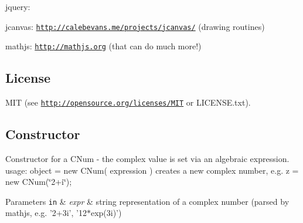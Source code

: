 \begin{DoxyItemize}
\item jquery\+:
\item jcanvas\+: \href{http://calebevans.me/projects/jcanvas/}{\tt http\+://calebevans.\+me/projects/jcanvas/} (drawing routines)
\item mathjs\+: \href{http://mathjs.org}{\tt http\+://mathjs.\+org} (that can do much more!) 
\end{DoxyItemize}\hypertarget{index_license}{}\subsection{License}\label{index_license}
M\+I\+T (see \href{http://opensource.org/licenses/MIT}{\tt http\+://opensource.\+org/licenses/\+M\+I\+T} or L\+I\+C\+E\+N\+S\+E.\+txt).\hypertarget{index_constructor}{}\subsection{Constructor}\label{index_constructor}
Constructor for a C\+Num -\/ the complex value is set via an algebraic expression. usage\+: object = new C\+Num( expression ) creates a new complex number, e.\+g. z = new C\+Num(\char`\"{}2+i\char`\"{});


\begin{DoxyParams}[1]{Parameters}
\mbox{\tt in}  & {\em expr} & string representation of a complex number (parsed by mathjs, e.\+g. '2+3i', '12$\ast$exp(3i)') \\
\hline
\end{DoxyParams}
